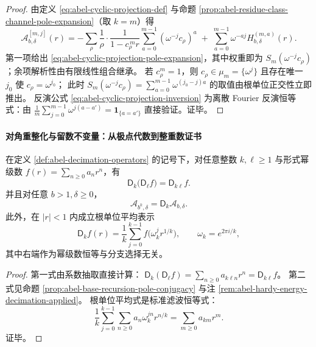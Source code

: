 \begin{proof}
由定义 \eqref{eq:abel-cyclic-projection-def} 与命题 \ref{prop:abel-residue-class-channel-pole-expansion}（取 \(k=m\)）得
\[
\mathcal A_{b,\delta}^{[m,j]}(r)
=-\sum_{\rho}\frac{1}{\rho}\cdot\frac{1}{1-c_\rho^{\,m}r}\sum_{a=0}^{m-1}(\omega^{-j}c_\rho)^a
\;+\;\sum_{a=0}^{m-1}\omega^{-aj}H_{b,\delta}^{(m,a)}(r).
\]
第一项给出 \eqref{eq:abel-cyclic-projection-pole-expansion}，其中权重即为 \(S_m(\omega^{-j}c_\rho)\)；余项解析性由有限线性组合继承。
若 \(c_\rho^m=1\)，则 \(c_\rho\in\mu_m=\{\omega^j\}\) 且存在唯一 \(j_0\) 使 \(c_\rho=\omega^{j_0}\)；
此时 \(S_m(\omega^{-j}c_\rho)=\sum_{a=0}^{m-1}\omega^{(j_0-j)a}\) 的取值由根单位正交性立即推出。
反演公式 \eqref{eq:abel-cyclic-projection-inversion} 为离散 Fourier 反演恒等式：由
\(
\frac{1}{m}\sum_{j=0}^{m-1}\omega^{j(a-a')}=\mathbf 1_{\{a=a'\}}
\)
直接验证。证毕。
\end{proof}

\paragraph{对角重整化与留数不变量：从极点代数到整重数证书}

\begin{proposition}[抽取重整化算子的半群恒等式]\label{prop:abel-decimation-semigroup-identity}
在定义 \ref{def:abel-decimation-operators} 的记号下，对任意整数 \(k,\ell\ge 1\) 与形式幂级数 \(f(r)=\sum_{n\ge 0}a_n r^n\)，有
\[
\mathsf D_k\!\bigl(\mathsf D_\ell f\bigr)=\mathsf D_{k\ell}f.
\]
并且对任意 \(b>1,\delta\ge 0\)，
\[
\mathcal A_{b^k,\delta}=\mathsf D_k\mathcal A_{b,\delta}.
\]
此外，在 \(|r|<1\) 内成立根单位平均表示
\[
\mathsf D_k f(r)=\frac1k\sum_{j=0}^{k-1}f\!\bigl(\omega_k^j r^{1/k}\bigr),
\qquad
\omega_k=e^{2\pi i/k},
\]
其中右端作为幂级数恒等与分支选择无关。
\end{proposition}
\begin{proof}
第一式由系数抽取直接计算：
\(
\mathsf D_k(\mathsf D_\ell f)=\sum_{n\ge 0}a_{k\ell n}r^n=\mathsf D_{k\ell}f
\)。
第二式见命题 \ref{prop:abel-base-recursion-pole-conjugacy} 与注 \ref{rem:abel-hardy-energy-decimation-applied}。
根单位平均式是标准滤波恒等式：
\[
\frac1k\sum_{j=0}^{k-1}\sum_{n\ge 0}a_n\omega_k^{jn}r^{n/k}
=\sum_{m\ge 0}a_{km}r^m.
\]
证毕。
\end{proof}


